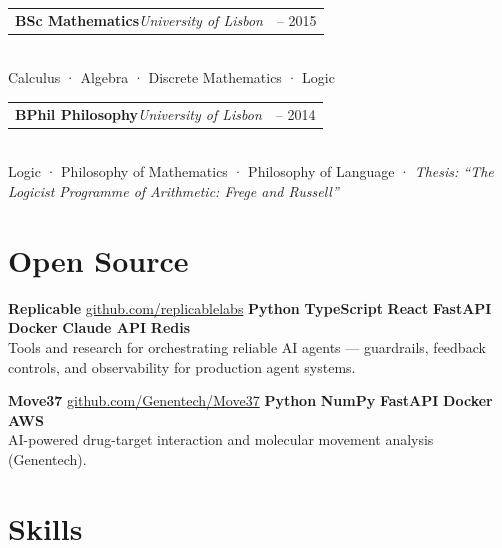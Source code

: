 \documentclass[10pt,a4paper]{article}
\makeatletter
\newcommand{\tech}[1]{%
  {\setlength{\fboxsep}{2.2pt}%
   \colorbox{tagbg}{\textcolor{brand}{\fontsize{6.5}{8}\selectfont\bfseries\sffamily #1}}}%
  \hspace{1pt}%
}
\newcommand{\datebadge}[1]{%
  {\setlength{\fboxsep}{2.5pt}%
   \colorbox{tagbg}{\textcolor{light}{\fontsize{7.5}{9}\selectfont\sffamily #1}}}%
}
\newcommand{\cvedu}[4]{%
  \noindent
  \begin{tabularx}{\linewidth}{@{}X r@{}}
    \textbf{#1}\enspace\textcolor{light}{\small\itshape #2} &
    \datebadge{#3}
  \end{tabularx}\\[-2pt]
  {\small\color{light} #4}\\[5pt]
}
\makeatother
\begin{document}
\cvedu{BSc Mathematics}{University of Lisbon}{2014 – 2015}%
{Calculus · Algebra · Discrete Mathematics · Logic}

\cvedu{BPhil Philosophy}{University of Lisbon}{2011 – 2014}%
{Logic · Philosophy of Mathematics · Philosophy of Language
 · \textit{Thesis: ``The Logicist Programme of Arithmetic: Frege and Russell''}}

\section{Open Source}

\noindent
\textbf{Replicable}\enspace
{\small\color{light}\href{https://github.com/replicablelabs}{github.com/replicablelabs}}
\hfill
\tech{Python}\tech{TypeScript}\tech{React}\tech{FastAPI}\tech{Docker}\tech{Claude API}\tech{Redis}\\
{\small Tools and research for orchestrating reliable AI agents ---
guardrails, feedback controls, and observability for production agent systems.}

\vspace{5pt}

\noindent
\textbf{Move37}\enspace
{\small\color{light}\href{https://github.com/Genentech/Move37}{github.com/Genentech/Move37}}
\hfill
\tech{Python}\tech{NumPy}\tech{FastAPI}\tech{Docker}\tech{AWS}\\
{\small AI-powered drug-target interaction and molecular movement analysis (Genentech).}

\section{Skills}
\end{document}
